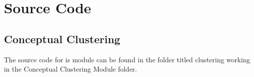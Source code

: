 %
%
%

\section{Source Code}

\subsection{Conceptual Clustering}
The source code for is module can be found in the folder titled clustering working in the Conceptual  Clustering Module folder.

